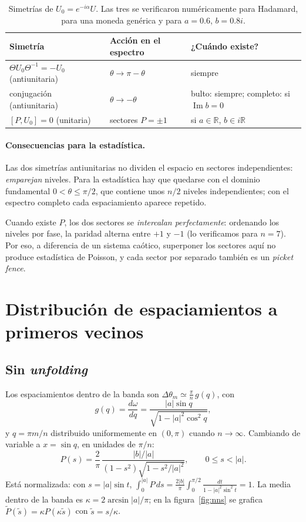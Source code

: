 \documentclass[11pt,a4paper]{article}
\theoremstyle{remark}
\newcommand{\im}{\operatorname{Im}}
\begin{document}
\begin{table}[ht]
\centering\small
\begin{tabular}{@{}lll@{}}
\toprule
Simetría & Acción en el espectro & ¿Cuándo existe? \\
\midrule
$\Theta U_0\Theta^{-1}=-U_0$ (antiunitaria) & $\theta\to\pi-\theta$ & siempre \\
conjugación (antiunitaria) & $\theta\to-\theta$ & bulto: siempre; completo: si $\im b=0$ \\
$[P,U_0]=0$ (unitaria) & sectores $P=\pm1$ & si $a\in\mathbb R$, $b\in i\mathbb R$ \\
\bottomrule
\end{tabular}
\caption{Simetrías de $U_0=e^{-i\alpha}U$. Las tres se verificaron
numéricamente para Hadamard, para una moneda genérica y para $a=0.6$, $b=0.8i$.}
\label{tab:sim}
\end{table}

\paragraph{Consecuencias para la estadística.}
Las dos simetrías antiunitarias no dividen el espacio en sectores
independientes: \emph{emparejan} niveles. Para la estadística hay que quedarse
con el dominio fundamental $0<\theta\le\pi/2$, que contiene unos $n/2$ niveles
independientes; con el espectro completo cada espaciamiento aparece repetido.

Cuando existe $P$, los dos sectores se \emph{intercalan perfectamente}:
ordenando los niveles por fase, la paridad alterna entre $+1$ y $-1$ (lo
verificamos para $n=7$). Por eso, a diferencia de un sistema caótico,
superponer los sectores aquí no produce estadística de Poisson, y cada sector
por separado también es un \emph{picket fence}.

\section{Distribución de espaciamientos a primeros vecinos}

\subsection{Sin \emph{unfolding}}
Los espaciamientos dentro de la banda son
$\Delta\theta_m\simeq\frac{\pi}{n}\,g(q)$, con
\begin{equation}
g(q)=\frac{d\omega}{dq}=\frac{|a|\sin q}{\sqrt{1-|a|^2\cos^2q}},
\end{equation}
y $q=\pi m/n$ distribuido uniformemente en $(0,\pi)$ cuando $n\to\infty$.
Cambiando de variable a $x=\sin q$, en unidades de $\pi/n$:
\begin{equation}
P(s)=\frac{2}{\pi}\,\frac{|b|/|a|}{(1-s^2)\sqrt{1-s^2/|a|^2}},\qquad 0\le s<|a|.
\label{eq:Ps}
\end{equation}
Está normalizada: con $s=|a|\sin t$,
$\int_0^{|a|}P\,ds=\frac{2|b|}{\pi}\int_0^{\pi/2}\frac{dt}{1-|a|^2\sin^2t}=1$.
La media dentro de la banda es $\kappa=2\arcsin|a|/\pi$; en la
figura~\ref{fig:nns} se grafica $\tilde P(\tilde s)=\kappa P(\kappa\tilde s)$
con $\tilde s=s/\kappa$.
\end{document}

